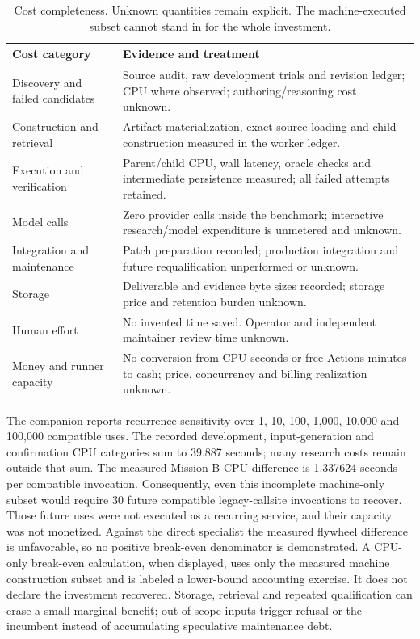 \documentclass[11pt,a4paper]{article}
\begin{document}
\begin{table}[htbp]\centering\small
\caption{Cost completeness. Unknown quantities remain explicit. The machine-executed subset cannot stand in for the whole investment.}
\label{tab:cost}
\begin{tabularx}{\textwidth}{@{}l X@{}}\toprule
Cost category & Evidence and treatment\\\midrule
Discovery and failed candidates & Source audit, raw development trials and revision ledger; CPU where observed; authoring/reasoning cost unknown.\\
Construction and retrieval & Artifact materialization, exact source loading and child construction measured in the worker ledger.\\
Execution and verification & Parent/child CPU, wall latency, oracle checks and intermediate persistence measured; all failed attempts retained.\\
Model calls & Zero provider calls inside the benchmark; interactive research/model expenditure is unmetered and unknown.\\
Integration and maintenance & Patch preparation recorded; production integration and future requalification unperformed or unknown.\\
Storage & Deliverable and evidence byte sizes recorded; storage price and retention burden unknown.\\
Human effort & No invented time saved. Operator and independent maintainer review time unknown.\\
Money and runner capacity & No conversion from CPU seconds or free Actions minutes to cash; price, concurrency and billing realization unknown.\\\bottomrule
\end{tabularx}
\end{table}

The companion reports recurrence sensitivity over 1, 10, 100, 1,000, 10,000 and 100,000 compatible uses. The recorded development, input-generation and confirmation CPU categories sum to 39.887 seconds; many research costs remain outside that sum. The measured Mission B CPU difference is 1.337624 seconds per compatible invocation. Consequently, even this incomplete machine-only subset would require 30 future compatible legacy-callsite invocations to recover. Those future uses were not executed as a recurring service, and their capacity was not monetized. Against the direct specialist the measured flywheel difference is unfavorable, so no positive break-even denominator is demonstrated. A CPU-only break-even calculation, when displayed, uses only the measured machine construction subset and is labeled a lower-bound accounting exercise. It does not declare the investment recovered. Storage, retrieval and repeated qualification can erase a small marginal benefit; out-of-scope inputs trigger refusal or the incumbent instead of accumulating speculative maintenance debt.
\end{document}
